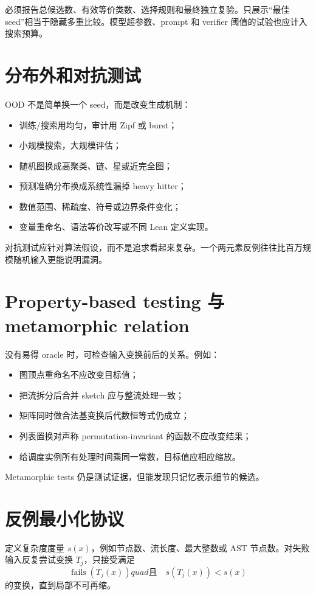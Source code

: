 必须报告总候选数、有效等价类数、选择规则和最终独立复验。只展示“最佳 seed”相当于隐藏多重比较。模型超参数、prompt 和 verifier 阈值的试验也应计入搜索预算。

\section{分布外和对抗测试}

OOD 不是简单换一个 seed，而是改变生成机制：
\begin{itemize}
  \item 训练/搜索用均匀，审计用 Zipf 或 burst；
  \item 小规模搜索，大规模评估；
  \item 随机图换成高聚类、链、星或近完全图；
  \item 预测准确分布换成系统性漏掉 heavy hitter；
  \item 数值范围、稀疏度、符号或边界条件变化；
  \item 变量重命名、语法等价改写或不同 Lean 定义实现。
\end{itemize}

对抗测试应针对算法假设，而不是追求看起来复杂。一个两元素反例往往比百万规模随机输入更能说明漏洞。

\section{Property-based testing 与 metamorphic relation}

没有易得 oracle 时，可检查输入变换前后的关系。例如：
\begin{itemize}
  \item 图顶点重命名不应改变目标值；
  \item 把流拆分后合并 sketch 应与整流处理一致；
  \item 矩阵同时做合法基变换后代数恒等式仍成立；
  \item 列表置换对声称 permutation-invariant 的函数不应改变结果；
  \item 给调度实例所有处理时间乘同一常数，目标值应相应缩放。
\end{itemize}
Metamorphic tests 仍是测试证据，但能发现只记忆表示细节的候选。

\section{反例最小化协议}

定义复杂度度量 $s(x)$，例如节点数、流长度、最大整数或 AST 节点数。对失败输入反复尝试变换 $T_j$，只接受满足
\[
\operatorname{fails}(T_j(x))quad\text{且}\quad s(T_j(x))<s(x)
\]
的变换，直到局部不可再缩。

